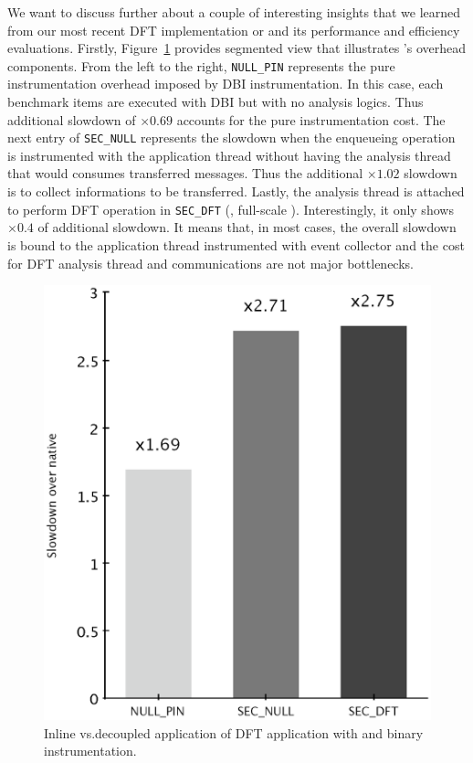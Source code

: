 We want to discuss further about a couple of interesting insights that we
learned from our most recent DFT implementation or \sreplica and its
performance and efficiency evaluations. Firstly, Figure~\ref{fig:sreplica0}
provides segmented view that illustrates \sreplica's overhead components. From
the left to the right, {\tt NULL\_PIN} represents the pure instrumentation
overhead imposed by DBI instrumentation. In this case, each benchmark items are
executed with \pin DBI but with no analysis logics. Thus additional slowdown of
$\times 0.69$ accounts for the pure instrumentation cost. The next entry of
{\tt SEC\_NULL} represents the slowdown when the enqueueing operation is
instrumented with the application thread without having the analysis thread
that would consumes transferred messages. Thus the additional $\times 1.02$
slowdown is to collect informations to be transferred. Lastly, the analysis
thread is attached to perform DFT operation in {\tt SEC\_DFT} (\ie, full-scale
\sreplica). Interestingly, it only shows $\times 0.4$ of additional slowdown.
It means that, in most cases, the overall slowdown is bound to the application
thread instrumented with event collector and the cost for DFT analysis thread
and communications are not major bottlenecks.

\begin{figure}[tb]
    \centering
    \includegraphics[width=0.33\linewidth]{figs/sreplica0.eps}
    \caption{Inline vs.decoupled application of DFT application with \sreplica
    and binary instrumentation.\label{fig:sreplica0}}
\end{figure}

